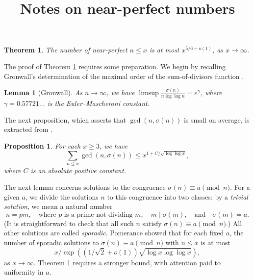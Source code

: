 \documentclass[12pt]{amsart}
\title{Notes on near-perfect numbers}
\newtheorem{thm}{Theorem}
\newtheorem{lem}{Lemma}
\newtheorem{prop}{Proposition}
\begin{document}
\renewcommand{\labelenumi}{(\roman{enumi})}
\def\N{\mathbf{N}}
\def\Q{\mathbf{Q}}
\def\Z{\mathbf{Z}}
\def\R{\mathbf{R}}
\def\S{\curly{S}}
\def\lcm{\mathrm{lcm}}
\maketitle

%
%

\begin{thm}\label{thm:nearperf} The number of near-perfect $n\leq x$ is at most $x^{5/6+o(1)}$, as $x\to\infty$.
\end{thm}

The proof of Theorem \ref{thm:nearperf} requires some preparation. We begin by recalling Gronwall's determination of the maximal order of the sum-of-divisors function \cite[Theorem 323]{HW08}.

\begin{lem}[Gronwall]\label{lem:gronwall} As $n\to\infty$, we have $\limsup \frac{\sigma(n)}{n\log\log{n}} = e^{\gamma}$,
	where $\gamma = 0.57721\dots$ is the Euler--Mascheroni constant.
\end{lem}

The next proposition, which asserts that $\gcd(n,\sigma(n))$ is small on average, is extracted from \cite[Theorem 1.3]{pollack11}. 

\begin{prop}\label{prop:wirsinggcd} For each $x \geq 3$, we have
\[ \sum_{n \leq x} \gcd(n,\sigma(n)) \leq x^{1 + C/\sqrt{\log\log{x}}}, \]
where $C$ is an absolute positive constant.
\end{prop}

The next lemma concerns solutions to the congruence $\sigma(n) \equiv a\pmod{n}$. For a given $a$, we divide the solutions $n$ to this congruence into two classes: by a \emph{trivial solution}, we mean a natural number 
\begin{equation}\label{eq:regform} n = pm, \quad\text{where $p$ is a prime not dividing $m$},  \quad m \mid \sigma(m), \quad\text{and}\quad \sigma(m)=a. \end{equation}
(It is straightforward to check that all such $n$ satisfy $\sigma(n)\equiv a\pmod{n}$.) All other solutions are called \emph{sporadic}. Pomerance \cite[Theorem 3]{pomerance75} showed that for each fixed $a$, the number of sporadic solutions to $\sigma(n)\equiv a\pmod{n}$ with $n \leq x$ is at most 
\begin{equation}\label{eq:numsols0} x/\exp((1/\sqrt{2}+o(1))\sqrt{\log{x}\log\log{x}}),\end{equation} as $x\to\infty$. Theorem \ref{thm:nearperf} requires a stronger bound, with attention paid to uniformity in $a$.
\end{document}
